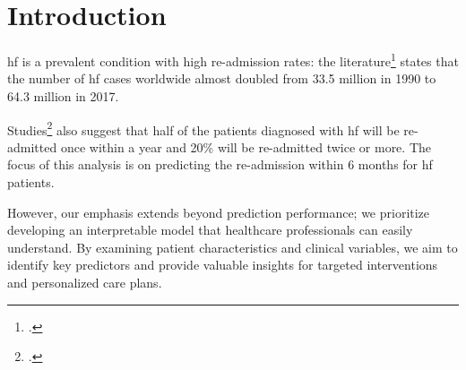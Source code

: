 \section{Introduction}

\gls{hf} is a prevalent condition with high re-admission rates: the literature\footcite{Bragazzi2021Burden} states that the number of \gls{hf} cases worldwide almost doubled from 33.5 million in 1990 to 64.3 million in 2017.

Studies\footcite{Groenewegen2020Epidemiology} also suggest that half of the patients diagnosed with \gls{hf} will be re-admitted once within a year and 20\% will be re-admitted twice or more. The focus of this analysis is on predicting the re-admission within 6 months for \gls{hf} patients.

However, our emphasis extends beyond prediction performance; we prioritize developing an interpretable model that healthcare professionals can easily understand. By examining patient characteristics and clinical variables, we aim to identify key predictors and provide valuable insights for targeted interventions and personalized care plans.
